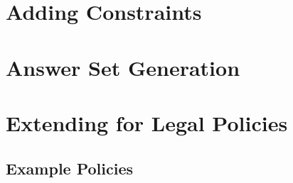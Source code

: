 
\section{Adding Constraints}
\label{sec:t-constraints}

\section{Answer Set Generation}
\label{sec:t-asp}

\section{Extending for Legal Policies}
\label{sec:t-legal}

\subsection{Example Policies}

